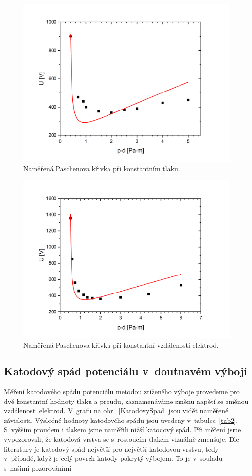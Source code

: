 \documentclass[a4paper,12pt]{article}
\begin{document}
\begin{figure}[h!]
	\centering
	\includegraphics[width=150mm]{tlakfixed.png}
	\caption{Naměřená Paschenova křivka při konstantním tlaku.}
	\label{tlakfixed}
\end{figure}


\begin{figure}[h!]
	\centering
	\includegraphics[width=150mm]{dfixed.png}
	\caption{Naměřená Paschenova křivka při konstantní vzdálenosti elektrod.}
	\label{dfixed}
\end{figure}

\clearpage
\subsection{Katodový spád potenciálu v~doutnavém výboji}
Měření katodového spádu potenciálu metodou ztíženého výboje provedeme pro dvě konstantní hodnoty tlaku a proudu, 
zaznamenáváme změnu napětí se změnou vzdálenosti elektrod. V~grafu na 
obr.~\ref{KatodovySpad} jsou vidět naměřené závislosti. Výsledné hodnoty 
katodového spádu jsou uvedeny v~tabulce~\ref{tab2}. S~vyšším proudem i tlakem
jsme naměřili nižší katodový spád. Při měření jsme vypozorovali, 
že katodová vrstva se s~rostoucím tlakem vizuálně zmenšuje. Dle literatury je katodový spád největší pro největší katodovou vrstvu, tedy v~případě, když je celý povrch katody pokrytý výbojem. To je v~souladu s~našimi pozorováními.
\end{document}
